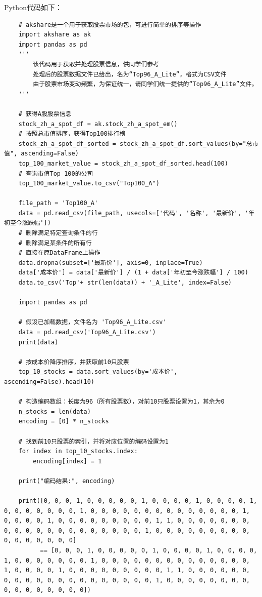 \documentclass[journal,twoside,web]{ieeecolor}
\begin{document}
Python代码如下：
\begin{lstlisting}
    # akshare是一个用于获取股票市场的包，可进行简单的排序等操作
    import akshare as ak
    import pandas as pd
    '''
        该代码用于获取并处理股票信息，供同学们参考
        处理后的股票数据文件已给出，名为“Top96_A_Lite”，格式为CSV文件
        由于股票市场变动频繁，为保证统一，请同学们统一提供的“Top96_A_Lite”文件。
    '''
    
    # 获得A股股票信息
    stock_zh_a_spot_df = ak.stock_zh_a_spot_em()
    # 按照总市值排序，获得Top100排行榜
    stock_zh_a_spot_df_sorted = stock_zh_a_spot_df.sort_values(by="总市值", ascending=False)
    top_100_market_value = stock_zh_a_spot_df_sorted.head(100)
    # 查询市值Top 100的公司
    top_100_market_value.to_csv("Top100_A")
    
    file_path = 'Top100_A'
    data = pd.read_csv(file_path, usecols=['代码', '名称', '最新价', '年初至今涨跌幅'])
    # 删除满足特定查询条件的行
    # 删除满足某条件的所有行
    # 直接在原DataFrame上操作
    data.dropna(subset=['最新价'], axis=0, inplace=True)
    data['成本价'] = data['最新价'] / (1 + data['年初至今涨跌幅'] / 100)
    data.to_csv('Top'+ str(len(data)) + '_A_Lite', index=False)
    
    import pandas as pd
    
    # 假设已加载数据，文件名为 'Top96_A_Lite.csv'
    data = pd.read_csv('Top96_A_Lite.csv')
    print(data)
    
    # 按成本价降序排序，并获取前10只股票
    top_10_stocks = data.sort_values(by='成本价', ascending=False).head(10)
    
    # 构造编码数组：长度为96（所有股票数），对前10只股票设置为1，其余为0
    n_stocks = len(data)
    encoding = [0] * n_stocks
    
    # 找到前10只股票的索引，并将对应位置的编码设置为1
    for index in top_10_stocks.index:
        encoding[index] = 1
    
    print("编码结果:", encoding)
    
    print([0, 0, 0, 1, 0, 0, 0, 0, 0, 1, 0, 0, 0, 0, 1, 0, 0, 0, 0, 1, 0, 0, 0, 0, 0, 0, 0, 1, 0, 0, 0, 0, 0, 0, 0, 0, 0, 0, 0, 0, 0, 0, 1, 0, 0, 0, 0, 1, 0, 0, 0, 0, 0, 0, 0, 0, 0, 1, 1, 0, 0, 0, 0, 0, 0, 0, 0, 0, 0, 0, 0, 0, 0, 0, 0, 0, 0, 0, 0, 1, 0, 0, 0, 0, 0, 0, 0, 0, 0, 0, 0, 0, 0, 0, 0, 0]
          == [0, 0, 0, 1, 0, 0, 0, 0, 0, 1, 0, 0, 0, 0, 1, 0, 0, 0, 0, 1, 0, 0, 0, 0, 0, 0, 0, 1, 0, 0, 0, 0, 0, 0, 0, 0, 0, 0, 0, 0, 0, 0, 1, 0, 0, 0, 0, 1, 0, 0, 0, 0, 0, 0, 0, 0, 0, 1, 1, 0, 0, 0, 0, 0, 0, 0, 0, 0, 0, 0, 0, 0, 0, 0, 0, 0, 0, 0, 0, 1, 0, 0, 0, 0, 0, 0, 0, 0, 0, 0, 0, 0, 0, 0, 0, 0])
    
\end{lstlisting}
\end{document}
